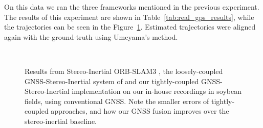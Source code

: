 On this data we ran the three frameworks mentioned in the previous experiment. The results of this experiment are shown in Table~\ref{tab:real_gps_results}, while the trajectories can be seen in the Figure~\ref{fig:trajectories_zavalla}. Estimated trajectories were aligned again with the ground-truth using
Umeyama's method.


\begin{figure}[!btp]
    \centering
  \hspace{1cm}
  \\
    \caption{Results from Stereo-Inertial ORB-SLAM3 \cite{campos2021orbslam3}, the loosely-coupled GNSS-Stereo-Inertial system of \cite{qin2019general} and our tightly-coupled GNSS-Stereo-Inertial implementation on our in-house recordings in soybean fields, using conventional GNSS. Note the smaller errors of tightly-coupled approaches, and how our GNSS fusion improves over the stereo-inertial baseline.}
    \label{fig:trajectories_zavalla}
\end{figure}

